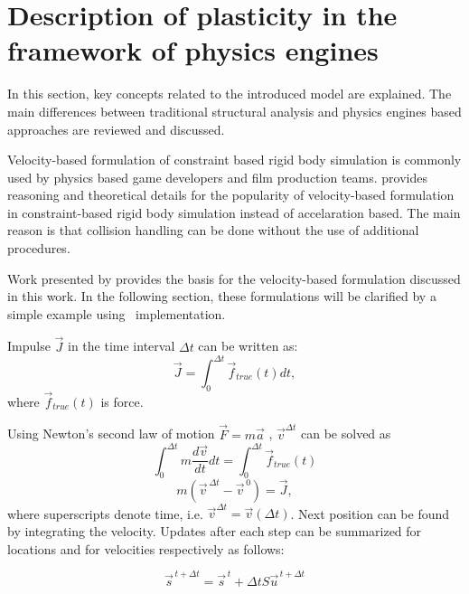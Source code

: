 \section{Description of plasticity in the framework of physics engines}

In this section, key concepts related to the introduced model are explained. The main differences between 
traditional structural analysis and physics engines based approaches are reviewed and discussed.

Velocity-based formulation of constraint based rigid body simulation 
is  commonly used by physics based game
developers and film production teams.
\cite{erleben.thesis} 
provides reasoning and theoretical details for the popularity of 
velocity-based formulation in constraint-based rigid body simulation instead of accelaration based. 
The main reason is that collision handling can be done without the use of additional procedures.

Work presented by  
\cite{erleben.thesis} provides the basis for the velocity-based formulation discussed in this work.
In the following section, these formulations will be clarified by a simple example using \bullet\ implementation.

Impulse $\vec{J}$
in the time interval $\Delta t $ can be written as:
\begin{equation} \label{eq:impulseIntegral}
\vec{J} = \int_{0}^{\Delta t} \vec{f}_{true}(t) dt,
\end{equation}
where $\vec{f}_{true}(t)$ is force.

Using Newton's second law of motion $\vec{F}=m\vec{a}$ ,
$\vec{v}^{\Delta t}$ can be solved as
\begin{equation} \label{eq:impulseIntegraWithNewton}
\int_{0}^{\Delta t} m \frac{d\vec{v}}{dt}dt= \int_{0}^{\Delta t} \vec{f}_{true}(t)
\end{equation}
\begin{equation} \label{eq:impulse}
m(\vec{v}^{\, \Delta t} - \vec{v}^{\, 0})=\vec{J},
\end{equation}
where superscripts denote time, i.e. ${\vec{v}}^{\Delta t}=\vec{v}(\Delta t)$.
Next position can be found
by integrating the velocity.
Updates after each step can be summarized  for locations and  
for velocities respectively as follows:

\begin{equation} \label{eq:eomL} %
\vec{s}^{\, t+\Delta t} = \vec{s}^{\, t}+\Delta t S \vec{u}^{\, t+\Delta t}
\end{equation}


